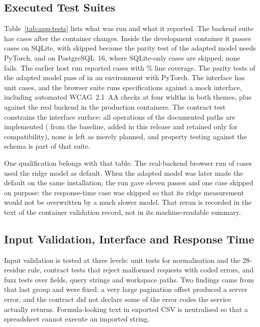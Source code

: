 \subsection{Executed Test Suites}
Table~\ref{tab:app-tests} lists what was run and what it reported. The backend suite has
\nAppDockerTotal{} cases after the container changes. Inside the development container it passes
\nAppDockerSqlitePassed{} cases on SQLite, with \nAppDockerSqliteSkipped{} skipped because the parity
test of the adapted model needs PyTorch, and \nAppDockerPgPassed{} on PostgreSQL~16, where
\nAppDockerPgSkipped{} SQLite-only cases are skipped; none fails. The earlier host run reported
\nAppBackendTests{} cases with \nAppBackendCoverage\% line coverage. The parity tests of the adapted
model pass \nAppLoraParityTests{} of \nAppLoraParityTests{} in an environment with PyTorch. The
interface has \nAppDockerVitest{} unit cases, and the browser suite runs \nAppBrowserMock{}
specifications against a mock interface, including automated WCAG~2.1~AA checks at four widths in
both themes, plus \nAppDockerReal{} against the real backend in the production containers. The
contract test constrains the interface surface: all \nAppOperations{} operations of the
\nAppPaths{} documented paths are implemented (\nAppOpsBaseline{} from the baseline, \nAppOpsNew{}
added in this release and \nAppOpsLegacy{} retained only for compatibility), none is left as merely
planned, and property testing against the schema is part of that suite.

One qualification belongs with that table. The real-backend browser run of \nAppDockerReal{} cases
used the ridge model as default. When the adapted model was later made the default on the same
installation, the run gave eleven passes and one case skipped on purpose: the response-time case was
skipped so that its ridge measurement would not be overwritten by a much slower model. That rerun is
recorded in the text of the container validation record, not in its machine-readable summary.

\subsection{Input Validation, Interface and Response Time}
Input validation is tested at three levels: unit tests for normalisation and the 28-residue rule,
contract tests that reject malformed requests with coded errors, and fuzz tests over fields, query
strings and workspace paths. Two findings came from that last group and were fixed: a very large
pagination offset produced a server error, and the contract did not declare some of the error codes
the service actually returns. Formula-looking text in exported CSV is neutralised so that a
spreadsheet cannot execute an imported string.

